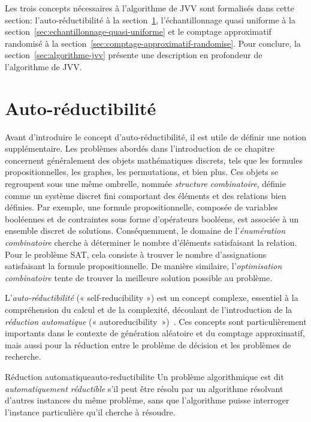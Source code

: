 Les trois concepts nécessaires à l'algorithme de JVV sont formalisés dans cette section: l'auto-réductibilité à la section~\ref{sec:auto-reductibilite}, l'échantillonnage quasi uniforme à la section~\ref{sec:echantillonnage-quasi-uniforme} et le comptage approximatif randomisé à la section~\ref{sec:comptage-approximatif-randomise}. Pour conclure, la section~\ref{sec:algorithme-jvv} présente une description en profondeur de l'algorithme de JVV.


\section{Auto-réductibilité}
\label{sec:auto-reductibilite}

Avant d'introduire le concept d'auto-réductibilité, il est utile de définir une notion supplémentaire. Les problèmes abordés dans l'introduction de ce chapitre concernent généralement des objets mathématiques discrets, tels que les formules propositionnelles, les graphes, les permutations, et bien plus. Ces objets se regroupent sous une même ombrelle, nommée \textit{structure combinatoire}, définie comme un système discret fini comportant des éléments et des relations bien définies. Par exemple, une formule propositionnelle, composée de variables booléennes et de contraintes sous forme d'opérateurs booléens, est associée à un ensemble discret de solutions. Conséquemment, le domaine de l'\textit{énumération combinatoire} cherche à déterminer le nombre d'éléments satisfaisant la relation. Pour le problème SAT, cela consiste à trouver le nombre d'assignations satisfaisant la formule propositionnelle. De manière similaire, l'\textit{optimisation combinatoire} tente de trouver la meilleure solution possible au problème.

L'\textit{auto-réductibilité} (« self-reducibility ») est un concept complexe, essentiel à la compréhension du calcul et de la complexité, découlant de l'introduction de la \textit{réduction automatique} (« autoreducibility »)~\cite{trakhtenbrotAutoreducibility1970, selkeAutoreducibilityFriendsMeasuring2006}. Ces concepts sont particulièrement importants dans le contexte de génération aléatoire et du comptage approximatif, mais aussi pour la réduction entre le problème de décision et les problèmes de recherche.

\begin{subdefinition}{Réduction automatique}{auto-reductibilite}
    Un problème algorithmique est dit \textit{automatiquement réductible} s'il peut être résolu par un algorithme résolvant d'autres instances du même problème, sans que l'algorithme puisse interroger l'instance particulière qu'il cherche à résoudre.
\end{subdefinition}

